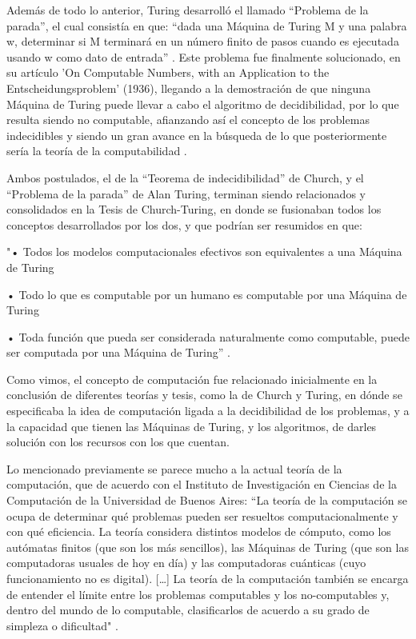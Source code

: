 \documentclass[12pt]{article}
\begin{document}
{Además de todo lo anterior, Turing desarrolló el llamado “Problema de la parada”, el cual consistía en que: “dada una Máquina de Turing M y una palabra w, determinar si M terminará en un número finito de pasos cuando es ejecutada usando w como dato de entrada” \citep{ParadaWiki}. Este problema fue finalmente solucionado, en su artículo 'On Computable Numbers, with an Application to the Entscheidungsproblem' (1936), llegando a la demostración de que ninguna Máquina de Turing puede llevar a cabo el algoritmo de decidibilidad, por lo que resulta siendo no computable, afianzando así el concepto de los problemas indecidibles y siendo un gran avance en la búsqueda de lo que posteriormente sería la teoría de la computabilidad \citep{Llopismatesfacil}.
\newline

Ambos postulados, el de la “Teorema de indecidibilidad” de Church, y el “Problema de la parada” de Alan Turing, terminan siendo relacionados y consolidados en la Tesis de Church-Turing, en donde se fusionaban todos los conceptos desarrollados por los dos, y que podrían ser resumidos en que: 

"•  Todos los modelos computacionales efectivos son equivalentes a una Máquina de Turing

•	Todo lo que es computable por un humano es computable por una Máquina de Turing

•	Toda función que pueda ser considerada naturalmente como computable, puede ser computada por una Máquina de Turing” \citep{MonicaPrezi}.


Como vimos, el concepto de computación fue relacionado inicialmente en la conclusión de diferentes teorías y tesis, como la de Church y Turing, en dónde se especificaba la idea de computación ligada a la decidibilidad de los problemas, y a la capacidad que tienen las Máquinas de Turing, y los algoritmos, de darles solución con los recursos con los que cuentan.
\newline

Lo mencionado previamente se parece mucho a la actual teoría de la computación, que de acuerdo con el Instituto de Investigación en Ciencias de la Computación de la Universidad de Buenos Aires:  “La teoría de la computación se ocupa de determinar qué problemas pueden ser resueltos computacionalmente y con qué eficiencia. La teoría considera distintos modelos de cómputo, como los autómatas finitos (que son los más sencillos), las Máquinas de Turing (que son las computadoras usuales de hoy en día) y las computadoras cuánticas (cuyo funcionamiento no es digital). […] La teoría de la computación también se encarga de entender el límite entre los problemas computables y los no-computables y, dentro del mundo de lo computable, clasificarlos de acuerdo a su grado de simpleza o dificultad" \citep{Tcompticc}.
\newline

}
\end{document}
